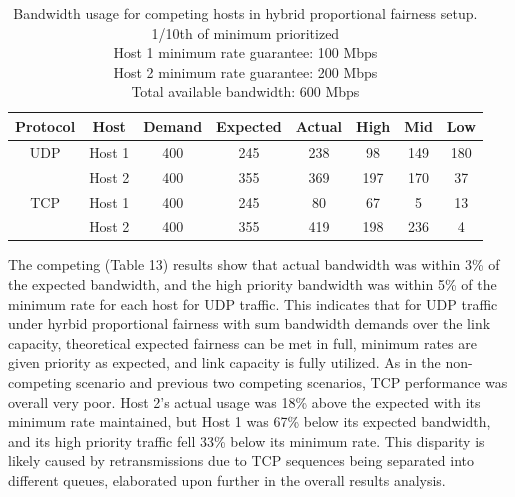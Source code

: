 \documentclass[accepted,single]{gipaper}
\begin{document}
\begin{table}[h]
	\label{hybr_c}
	\vspace{-2mm}
	\begin{center}
		\begin{small}
		\setlength\tabcolsep{1.5pt}
			\begin{tabular}{cccccccc}
				Protocol & Host & Demand & Expected & Actual & High & Mid & Low\\
				\hline
				UDP & Host 1 & 400 & 245 & 238 & 98 & 149 & 180\\
				    & Host 2 & 400 & 355 & 369 & 197 & 170 & 37\\
				\hline
				TCP & Host 1 & 400 & 245 & 80 & 67 & 5 & 13\\
				    & Host 2 & 400 & 355 & 419 & 198 & 236 & 4\\
			\end{tabular}
		\end{small}
	\end{center}
	\caption{Bandwidth usage for competing hosts in hybrid proportional fairness setup.\\
	1/10th of minimum prioritized\\
	Host 1 minimum rate guarantee: 100 Mbps\\
	Host 2 minimum rate guarantee: 200 Mbps\\	
	Total available bandwidth: 600 Mbps}
	\vspace{-3mm}
\end{table}

The competing (Table 13) results show that actual bandwidth was within 3\% of the expected bandwidth, and the high priority bandwidth was within 5\% of the minimum rate for each host for UDP traffic. This indicates that for UDP traffic under hyrbid proportional fairness with sum bandwidth demands over the link capacity, theoretical expected fairness can be met in full, minimum rates are given priority as expected, and link capacity is fully utilized. As in the non-competing scenario and previous two competing scenarios, TCP performance was overall very poor. Host 2's actual usage was 18\% above the expected with its minimum rate maintained, but Host 1 was 67\% below its expected bandwidth, and its high priority traffic fell 33\% below its minimum rate. This disparity is likely caused by retransmissions due to TCP sequences being separated into different queues, elaborated upon further in the overall results analysis.
\end{document}
